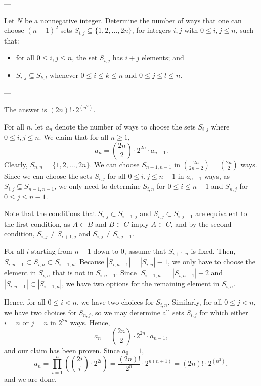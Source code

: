 
---

Let $N$ be a nonnegative integer. Determine the number of ways that one can choose $(n+1)^2$ sets $S_{i,j}\subseteq\{1,2,\ldots,2n\}$, for integers $i,j$ with $0\le i,j\le n$, such that:
\begin{itemize}[itemsep=0em]
    \item for all $0\le i,j\le n$, the set $S_{i,j}$ has $i+j$ elements; and
    \item $S_{i,j}\subseteq S_{k,l}$ whenever $0\le i\le k\le n$ and $0\le j\le l\le n$.
\end{itemize}

---

The answer is $(2n)!\cdot 2^{(n^2)}$.

For all $n$, let $a_n$ denote the number of ways to choose the sets $S_{i,j}$ where $0\le i,j\le n$. We claim that for all $n\ge 1$, \[a_n=\binom{2n}2\cdot 2^{2n}\cdot a_{n-1}.\]
Clearly, $S_{n,n}=\{1,2,\ldots,2n\}$. We can choose $S_{n-1,n-1}$ in $\binom{2n}{2n-2}=\binom{2n}2$ ways. Since we can choose the sets $S_{i,j}$ for all $0\le i,j\le n-1$ in $a_{n-1}$ ways, as $S_{i,j}\subseteq S_{n-1,n-1}$, we only need to determine $S_{i,n}$ for $0\le i\le n-1$ and $S_{n,j}$ for $0\le j\le n-1$.

Note that the conditions that $S_{i,j}\subset S_{i+1,j}$ and $S_{i,j}\subset S_{i,j+1}$ are equivalent to the first condition, as $A\subset B$ and $B\subset C$ imply $A\subset C$, and by the second condition, $S_{i,j}\ne S_{i+1,j}$ and $S_{i,j}\ne S_{i,j+1}$.

For all $i$ starting from $n-1$ down to $0$, assume that $S_{i+1,n}$ is fixed. Then, $S_{i,n-1}\subset S_{i,n}\subset S_{i+1,n}$. Because $|S_{i,n-1}|=|S_{i,n}|-1$, we only have to choose the element in $S_{i,n}$ that is not in $S_{i,n-1}$. Since $|S_{i+1,n}|=|S_{i,n-1}|+2$ and $|S_{i,n-1}|\subset|S_{i+1,n}|$, we have two options for the remaining element in $S_{i,n}$.

Hence, for all $0\le i<n$, we have two choices for $S_{i,n}$. Similarly, for all $0\le j<n$, we have two choices for $S_{n,j}$, so we may determine all sets $S_{i,j}$ for which either $i=n$ or $j=n$ in $2^{2n}$ ways. Hence, \[a_n=\binom{2n}2\cdot 2^{2n}\cdot a_{n-1},\]
and our claim has been proven. Since $a_0=1$, \[a_n=\prod_{i=1}^n\left(\binom{2i}i\cdot 2^{2i}\right)=\frac{(2n)!}{2^n}\cdot 2^{n(n+1)}=(2n)!\cdot 2^{(n^2)},\]
and we are done. 

